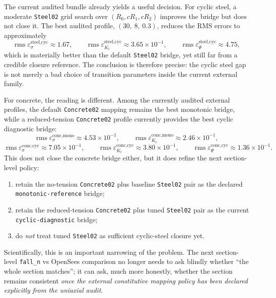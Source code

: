 The current audited bundle already yields a useful decision. For cyclic steel,
a moderate \texttt{Steel02} grid search over \((R_0,cR_1,cR_2)\) improves the
bridge but does not close it. The best audited profile,
\((30,\ 8,\ 0.3)\), reduces the RMS errors to approximately
\[
\operatorname{rms}\varepsilon_{\sigma}^{\text{steel,cyc}} \approx 1.67,\qquad
\operatorname{rms}\varepsilon_{K_t}^{\text{steel,cyc}} \approx 3.65\times10^{-1},\qquad
\operatorname{rms}\varepsilon_{\Psi}^{\text{steel,cyc}} \approx 4.75,
\]
which is materially better than the default \texttt{Steel02} bridge, yet still
far from a credible closure reference. The conclusion is therefore precise:
the cyclic steel gap is not merely a bad choice of transition parameters inside
the current external family.

For concrete, the reading is different. Among the currently audited external
profiles, the default \texttt{Concrete02} mapping remains the best monotonic
bridge, while a reduced-tension \texttt{Concrete02} profile currently provides
the best cyclic diagnostic bridge:
\[
\operatorname{rms}\varepsilon_{\sigma}^{\text{conc,mono}} \approx 4.53\times10^{-1},\qquad
\operatorname{rms}\varepsilon_{K_t}^{\text{conc,mono}} \approx 2.46\times10^{-1},
\]
\[
\operatorname{rms}\varepsilon_{\sigma}^{\text{conc,cyc}} \approx 7.05\times10^{-1},\qquad
\operatorname{rms}\varepsilon_{K_t}^{\text{conc,cyc}} \approx 3.80\times10^{-1},\qquad
\operatorname{rms}\varepsilon_{\Psi}^{\text{conc,cyc}} \approx 1.36\times10^{-1}.
\]
This does not close the concrete bridge either, but it does refine the next
section-level policy:
\begin{enumerate}
  \item retain the no-tension \texttt{Concrete02} plus baseline
    \texttt{Steel02} pair as the declared
    \texttt{monotonic-reference} bridge;
  \item retain the reduced-tension \texttt{Concrete02} plus tuned
    \texttt{Steel02} pair as the current \texttt{cyclic-diagnostic} bridge;
  \item do \emph{not} treat tuned \texttt{Steel02} as sufficient cyclic-steel
    closure yet.
\end{enumerate}

Scientifically, this is an important narrowing of the problem. The next
section-level \texttt{fall\_n} vs OpenSees comparison no longer needs to ask
blindly whether ``the whole section matches''; it can ask, much more honestly,
whether the section remains consistent \emph{once the external constitutive
mapping policy has been declared explicitly from the uniaxial audit}.

